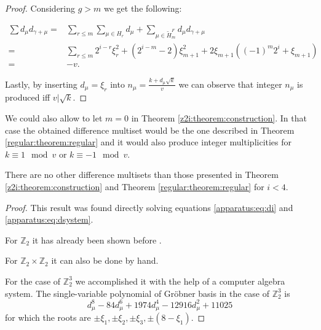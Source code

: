 \begin{proof}
    Considering $g > m$ we get the following:
    
    \begin{equation}
        \begin{split}
            \sum d_\mu d_{\gamma+\mu}
              = & \sum\limits_{r \leq m} \sum\limits_{\mu \in H_r} d_\mu
                + \sum\limits_{\mu \in \widetilde H_m^F} d_\mu d_{\gamma + \mu} \\
              = & \sum\limits_{r\leq m} 2^{i-r} \xi_r^2
                + (2^{i-m}-2) \xi_{m+1}^2 + 2\xi_{m+1}((-1)^m 2^i + \xi_{m+1}) \\
              = & -v.
        \end{split}
    \end{equation}
    
    Lastly, by inserting $d_\mu = \xi_r$ into $n_\mu=\frac{k+d_\mu \sqrt k}v$ we can observe that integer $n_\mu$ is produced iff $v | \sqrt k$.
\end{proof}

\begin{remark}
    We could also allow to let $m=0$ in Theorem \ref{z2i:theorem:construction}. In that case the obtained difference multiset would be the one described in 
Theorem \ref{regular:theorem:regular} and it would also produce  integer multiplicities for $k \equiv 1 \mod v$ or $k \equiv -1 \mod v$.
\end{remark}

\begin{theorem}
    There are no other difference multisets than those presented in Theorem \ref{z2i:theorem:construction} and Theorem \ref{regular:theorem:regular} for $i < 4$.
\end{theorem}

\begin{proof}
    This result was found directly solving equations \eqref{apparatus:eq:di} and \eqref{apparatus:eq:dsystem}.
    
    For $\mathbb Z_2$ it has already been shown before \cite{buratti1999old}.
    
    For $\mathbb Z_2 \times \mathbb Z_2$ it can also be done by hand.
    
    For the case of $\mathbb Z_2^3$ we accomplished it with the help of a computer algebra system. The single-variable polynomial of Gröbner basis in the case of $\mathbb Z_2^3$ is
    \begin{equation}
        d_\mu^8 - 84 d_\mu^6 + 1974 d_\mu^4 - 12916 d_\mu^2 + 11025
    \end{equation}
    for which the roots are $\pm\xi_1, \pm\xi_2, \pm\xi_3, \pm(8-\xi_1)$.
\end{proof}



